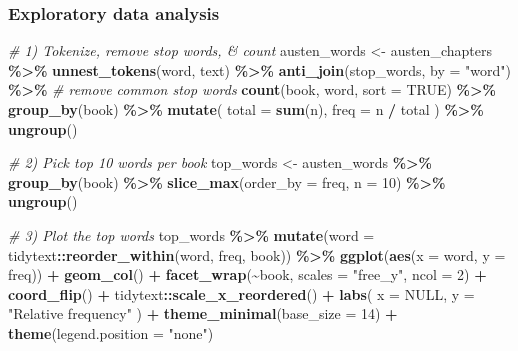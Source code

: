 \documentclass[
]{book}
\newenvironment{Shaded}{\begin{snugshade}}{\end{snugshade}}
\newcommand{\AttributeTok}[1]{\textcolor[rgb]{0.13,0.29,0.53}{#1}}
\newcommand{\CommentTok}[1]{\textcolor[rgb]{0.56,0.35,0.01}{\textit{#1}}}
\newcommand{\ConstantTok}[1]{\textcolor[rgb]{0.56,0.35,0.01}{#1}}
\newcommand{\DecValTok}[1]{\textcolor[rgb]{0.00,0.00,0.81}{#1}}
\newcommand{\FunctionTok}[1]{\textcolor[rgb]{0.13,0.29,0.53}{\textbf{#1}}}
\newcommand{\NormalTok}[1]{#1}
\newcommand{\OtherTok}[1]{\textcolor[rgb]{0.56,0.35,0.01}{#1}}
\newcommand{\SpecialCharTok}[1]{\textcolor[rgb]{0.81,0.36,0.00}{\textbf{#1}}}
\newcommand{\StringTok}[1]{\textcolor[rgb]{0.31,0.60,0.02}{#1}}
\begin{document}
\subsubsection{Exploratory data analysis}\label{exploratory-data-analysis}

\begin{Shaded}
\begin{Highlighting}[]
\CommentTok{\# 1) Tokenize, remove stop words, \& count}
\NormalTok{austen\_words }\OtherTok{\textless{}{-}}\NormalTok{ austen\_chapters }\SpecialCharTok{\%\textgreater{}\%}
  \FunctionTok{unnest\_tokens}\NormalTok{(word, text) }\SpecialCharTok{\%\textgreater{}\%}
  \FunctionTok{anti\_join}\NormalTok{(stop\_words, }\AttributeTok{by =} \StringTok{"word"}\NormalTok{) }\SpecialCharTok{\%\textgreater{}\%}   \CommentTok{\# remove common stop words}
  \FunctionTok{count}\NormalTok{(book, word, }\AttributeTok{sort =} \ConstantTok{TRUE}\NormalTok{) }\SpecialCharTok{\%\textgreater{}\%}
  \FunctionTok{group\_by}\NormalTok{(book) }\SpecialCharTok{\%\textgreater{}\%}
  \FunctionTok{mutate}\NormalTok{(}
    \AttributeTok{total =} \FunctionTok{sum}\NormalTok{(n),}
    \AttributeTok{freq  =}\NormalTok{ n }\SpecialCharTok{/}\NormalTok{ total}
\NormalTok{  ) }\SpecialCharTok{\%\textgreater{}\%}
  \FunctionTok{ungroup}\NormalTok{()}

\CommentTok{\# 2) Pick top 10 words per book}
\NormalTok{top\_words }\OtherTok{\textless{}{-}}\NormalTok{ austen\_words }\SpecialCharTok{\%\textgreater{}\%}
  \FunctionTok{group\_by}\NormalTok{(book) }\SpecialCharTok{\%\textgreater{}\%}
  \FunctionTok{slice\_max}\NormalTok{(}\AttributeTok{order\_by =}\NormalTok{ freq, }\AttributeTok{n =} \DecValTok{10}\NormalTok{) }\SpecialCharTok{\%\textgreater{}\%}
  \FunctionTok{ungroup}\NormalTok{()}

\CommentTok{\# 3) Plot the top words}
\NormalTok{top\_words }\SpecialCharTok{\%\textgreater{}\%}
  \FunctionTok{mutate}\NormalTok{(}\AttributeTok{word =}\NormalTok{ tidytext}\SpecialCharTok{::}\FunctionTok{reorder\_within}\NormalTok{(word, freq, book)) }\SpecialCharTok{\%\textgreater{}\%}
  \FunctionTok{ggplot}\NormalTok{(}\FunctionTok{aes}\NormalTok{(}\AttributeTok{x =}\NormalTok{ word, }\AttributeTok{y =}\NormalTok{ freq)) }\SpecialCharTok{+}
  \FunctionTok{geom\_col}\NormalTok{() }\SpecialCharTok{+}
  \FunctionTok{facet\_wrap}\NormalTok{(}\SpecialCharTok{\textasciitilde{}}\NormalTok{book, }\AttributeTok{scales =} \StringTok{"free\_y"}\NormalTok{, }\AttributeTok{ncol =} \DecValTok{2}\NormalTok{) }\SpecialCharTok{+}
  \FunctionTok{coord\_flip}\NormalTok{() }\SpecialCharTok{+}
\NormalTok{  tidytext}\SpecialCharTok{::}\FunctionTok{scale\_x\_reordered}\NormalTok{() }\SpecialCharTok{+}
  \FunctionTok{labs}\NormalTok{(}
    \AttributeTok{x =} \ConstantTok{NULL}\NormalTok{,}
    \AttributeTok{y =} \StringTok{"Relative frequency"}
\NormalTok{  ) }\SpecialCharTok{+}
  \FunctionTok{theme\_minimal}\NormalTok{(}\AttributeTok{base\_size =} \DecValTok{14}\NormalTok{) }\SpecialCharTok{+}
  \FunctionTok{theme}\NormalTok{(}\AttributeTok{legend.position =} \StringTok{"none"}\NormalTok{)}
\end{Highlighting}
\end{Shaded}
\end{document}
